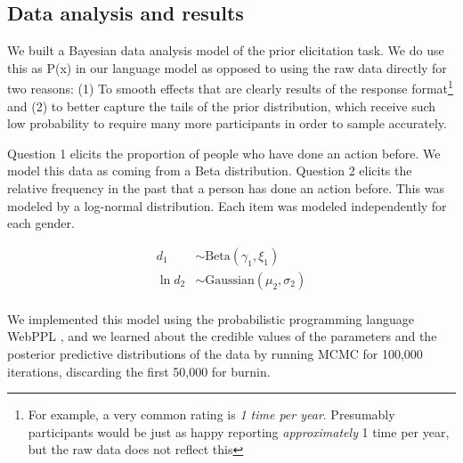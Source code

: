 \documentclass[10pt,letterpaper]{article}
\newcommand{\ndg}[1]{\textcolor{Green}{[ndg: #1]}}
\begin{document}
\subsection{Data analysis and results}
We built a Bayesian data analysis model of the prior elicitation task.
We do use this as P(x) in our language model as opposed to using the raw data directly for two reasons: (1) To smooth effects that are clearly results of the response format\footnote{For example, a very common rating is \emph{1 time per year}. Presumably participants would be just as happy reporting \emph{approximately} 1 time per year, but the raw data does not reflect this} 
and (2) to better capture the tails of the prior distribution, which receive such low probability to require many more participants in order to sample accurately.

Question 1 elicits the proportion of people who have done an action before. 
We model this data as coming from a Beta distribution. 
Question 2 elicits the relative frequency in the past that a person has done an action before.
This was modeled by a log-normal distribution. 
Each item was modeled independently for each gender.
%
\begin{minipage}{0.5 \textwidth} \small
\begin{align*}
d_{1} &\sim \text{Beta}(\gamma_{1}, \xi_{1}) \\
\ln d_{2} &\sim \text{Gaussian}(\mu_{2}, \sigma_{2}) \\
\end{align*}
\end{minipage}
%
We implemented this model using the probabilistic programming language WebPPL \cite{dippl}, and we learned about the credible values of the parameters and the posterior predictive distributions of the data by running MCMC for 100,000 iterations, discarding the first 50,000 for burnin.
%
\end{document}
